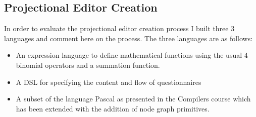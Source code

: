 \documentclass{article}
\begin{document}
\subsection{Projectional Editor Creation}\label{creationEvaluation}
In order to evaluate the projectional editor creation process I built three 3 languages and comment here on the process. The three languages are as follows:
\begin{itemize}
\item An expression language to define mathematical functions using the usual 4 binomial operators and a summation function.
\item A DSL for specifying the content and flow of questionnaires
\item A subset of the language Pascal as presented in the Compilers course which has been extended with the addition of node graph primitives. 
\end{itemize}
%
\end{document}

